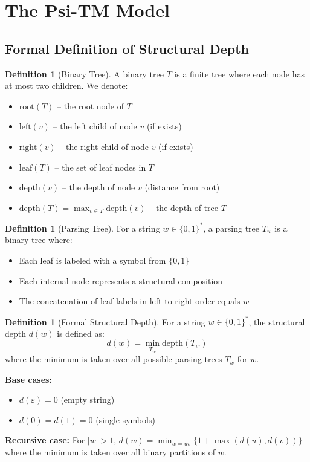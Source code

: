 \documentclass[11pt]{article}
\theoremstyle{definition}
\newtheorem{definition}[theorem]{Definition}
\begin{document}
\section{The Psi-TM Model}

\subsection{Formal Definition of Structural Depth}

\begin{definition}[Binary Tree]
A binary tree $T$ is a finite tree where each node has at most two children. We denote:
\begin{itemize}
\item $\text{root}(T)$ -- the root node of $T$
\item $\text{left}(v)$ -- the left child of node $v$ (if exists)
\item $\text{right}(v)$ -- the right child of node $v$ (if exists)
\item $\text{leaf}(T)$ -- the set of leaf nodes in $T$
\item $\text{depth}(v)$ -- the depth of node $v$ (distance from root)
\item $\text{depth}(T) = \max_{v \in T} \text{depth}(v)$ -- the depth of tree $T$
\end{itemize}
\end{definition}

\begin{definition}[Parsing Tree]
For a string $w \in \{0,1\}^*$, a parsing tree $T_w$ is a binary tree where:
\begin{itemize}
\item Each leaf is labeled with a symbol from $\{0,1\}$
\item Each internal node represents a structural composition
\item The concatenation of leaf labels in left-to-right order equals $w$
\end{itemize}
\end{definition}

\begin{definition}[Formal Structural Depth]
For a string $w \in \{0,1\}^*$, the structural depth $d(w)$ is defined as:
$$d(w) = \min_{T_w} \text{depth}(T_w)$$
where the minimum is taken over all possible parsing trees $T_w$ for $w$.

\textbf{Base cases:}
\begin{itemize}
\item $d(\varepsilon) = 0$ (empty string)
\item $d(0) = d(1) = 0$ (single symbols)
\end{itemize}

\textbf{Recursive case:}
For $|w| > 1$, $d(w) = \min_{w=uv} \{1 + \max(d(u), d(v))\}$ where the minimum is taken over all binary partitions of $w$.
\end{definition}
\end{document}
